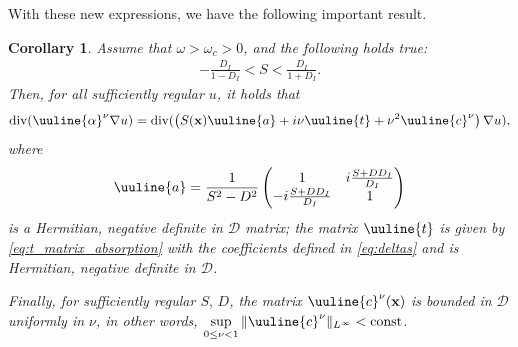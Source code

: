 \documentclass[report]{elsarticle}
\newtheorem{corollary}[theorem]{Corollary}
\numberwithin{theorem}{section}
\renewcommand{\vec}[1]{\mathbf{#1}}
\begin{document}
%
%
%
%
With these new expressions, we have the following important result. 
\begin{corollary}
	\label{cor:expansion}
Assume that $\omega>\omega_c>0$, and the following holds true:
	\begin{align}
		\label{eq:assump_var}
	 -\frac{D_I}{1-D_I}<S<\frac{D_I}{1+D_I}.
	\end{align}
Then, for all sufficiently regular $u$, it holds that  
\begin{align*}
	\operatorname{div}(\uuline{\alpha}^{\nu}\nabla u)=	\operatorname{div}(\left(S(\vec{x})\uuline{a}+i\nu\uuline{t}+\nu^2\uuline{c}^{\nu}\right)\nabla u), 
\end{align*}
where 
\begin{align*}
	\uuline{a}=\frac{1}{S^2-D^2}\left(
	\begin{matrix}
		1 & i\frac{S+DD_I}{D_I}\\
		-i\frac{S+DD_I}{D_I}& 1	
	\end{matrix}
	\right)
\end{align*}
is a Hermitian, negative definite in $\mathcal{D}$ matrix; the matrix $\uuline{t}$ is given by \eqref{eq:t_matrix_absorption} with the coefficients defined in \eqref{eq:deltas} and is Hermitian, negative definite in $\mathcal{D}$.

Finally, for sufficiently regular $S, \, D$, the matrix $\uuline{c}^{\nu}(\vec{x})$ is bounded in $\mathcal{D}$ uniformly in $\nu$, in other words, $\sup\limits_{0\leq \nu<1}\|\uuline{c}^{\nu}\|_{L^{\infty}}<\operatorname{const}$.
\end{corollary}
\end{document}
